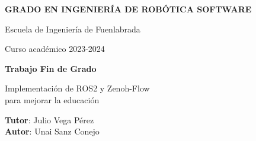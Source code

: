 \thispagestyle{empty}
\vspace{2cm}

\begin{figure}[htb]
  \centerline{}
\end{figure}

\begin{center}
  {\Large {\bf GRADO EN INGENIERÍA DE ROBÓTICA SOFTWARE}}
  \vspace{5mm}
 
  {\large {Escuela de Ingeniería de Fuenlabrada}}
  \vspace{5mm}

  {\large {Curso académico 2023-2024}}

  \vspace{1cm}

  {\large {\bf Trabajo Fin de Grado}}

  \vspace{2cm}

  {\Large { Implementación de ROS2 y Zenoh-Flow\\
            para mejorar la educación\\[1cm] }}

  \vspace{5cm}
  {\bf Tutor}: Julio Vega Pérez \\
  {\bf Autor}: Unai Sanz Conejo
\end{center}

\clearpage
\thispagestyle{empty}

